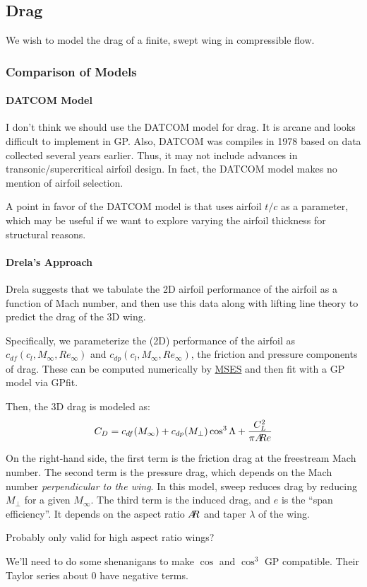 \documentclass[12pt]{article}
\newcommand{\ar}{A\mkern-6mu R}
\begin{document}
\subsection{Drag}
We wish to model the drag of a finite, swept wing in compressible flow. 

\subsubsection{Comparison of Models}
\paragraph{DATCOM Model}
I don't think we should use the DATCOM model for drag. It is arcane and looks difficult to implement in GP. Also, DATCOM was compiles in 1978 based on data collected several years earlier. Thus, it may not include advances in transonic/supercritical airfoil design. In fact, the DATCOM model makes no mention of airfoil selection.

A point in favor of the DATCOM model is that uses airfoil $t/c$ as a parameter, which may be useful if we want to explore varying the airfoil thickness for structural reasons. 

\paragraph{Drela's Approach}
Drela \cite{Drela2014} suggests that we tabulate the 2D airfoil performance of the airfoil as a function of Mach number, and then use this data along with lifting line theory to predict the drag of the 3D wing.

Specifically, we parameterize the (2D) performance of the airfoil as $c_{df}(c_l, M_\infty, Re_\infty)$ and $c_{dp}(c_l, M_\infty, Re_\infty)$, the friction and pressure components of drag. These can be computed numerically by \href{http://web.mit.edu/drela/Public/web/mses/}{MSES} and then fit with a GP model via GPfit.

Then, the 3D drag is modeled as:
\begin{equation}
C_D = c_{df}(M_\infty) + c_{dp}(M_\perp) \cos^3\Lambda + \frac{C_L^2}{\pi \ar e}
\end{equation}

On the right-hand side, the first term is the friction drag at the freestream Mach number. The second term is the pressure drag, which depends on the Mach number \emph{perpendicular to the wing}. In this model, sweep reduces drag by reducing $M_\perp$ for a given $M_\infty$. The third term is the induced drag, and $e$ is the ``span efficiency''. It depends on the aspect ratio $\ar$ and taper $\lambda$ of the wing.


Probably only valid for high aspect ratio wings?

We'll need to do some shenanigans to make $\cos$ and $\cos^3$ GP compatible. Their Taylor series about 0 have negative terms.

\printbibliography
\end{document}
